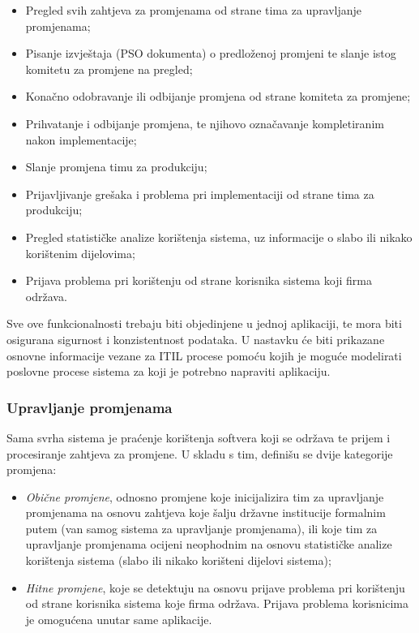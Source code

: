 \documentclass[12pt,a4paper]{article}
\begin{document}
\begin{itemize}
\renewcommand\labelitemi{$\square$}
\item Pregled svih zahtjeva za promjenama od strane tima za upravljanje promjenama;
\item Pisanje izvještaja (PSO dokumenta) o predloženoj promjeni te slanje istog komitetu za promjene na pregled;
\item Konačno odobravanje ili odbijanje promjena od strane komiteta za promjene;
\item Prihvatanje i odbijanje promjena, te njihovo označavanje kompletiranim nakon implementacije;
\item Slanje promjena timu za produkciju;
\item Prijavljivanje grešaka i problema pri implementaciji od strane tima za produkciju;
\item Pregled statističke analize korištenja sistema, uz informacije o slabo ili nikako korištenim dijelovima;
\item Prijava problema pri korištenju od strane korisnika sistema koji firma održava.
\end{itemize}

Sve ove funkcionalnosti trebaju biti objedinjene u jednoj aplikaciji, te mora biti osigurana sigurnost i konzistentnost podataka. U nastavku će biti prikazane osnovne informacije vezane za ITIL procese pomoću kojih je moguće modelirati poslovne procese sistema za koji je potrebno napraviti aplikaciju.

\subsubsection{Upravljanje promjenama}

\quad Sama svrha sistema je praćenje korištenja softvera koji se održava te prijem i procesiranje zahtjeva za promjene. U skladu s tim, definišu se dvije kategorije promjena:

\begin{itemize}
\renewcommand\labelitemi{-}
\item \textit{Obične promjene}, odnosno promjene koje inicijalizira tim za upravljanje promjenama na osnovu zahtjeva koje šalju državne institucije formalnim putem (van samog sistema za upravljanje promjenama), ili koje tim za upravljanje promjenama ocijeni neophodnim na osnovu statističke analize korištenja sistema (slabo ili nikako korišteni dijelovi sistema);
\item \textit{Hitne promjene}, koje se detektuju na osnovu prijave problema pri korištenju od strane korisnika sistema koje firma održava. Prijava problema korisnicima je omogućena unutar same aplikacije.
\end{itemize}
\end{document}
